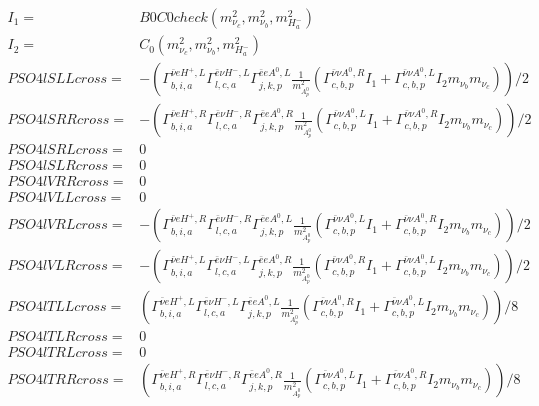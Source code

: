\documentclass[A4,landscape]{article}
\begin{document}
\begin{align} 
I_1= & B0C0check(m^2_{\nu_{{c}}}, m^2_{\nu_{{b}}}, m^2_{H^-_{{a}}}) \\ 
I_2= & C_0(m^2_{\nu_{{c}}}, m^2_{\nu_{{b}}}, m^2_{H^-_{{a}}}) \\ 
  PSO4lSLLcross= & -( \Gamma^{\bar{\nu}e H^+,L}_{b, i, a} \Gamma^{\bar{e}\nu H^- ,L}_{l, c, a} \Gamma^{\bar{e}e A^0 ,L}_{j, k, p} \frac{1}{m^2_{A^0_{{p}}}} (\Gamma^{\bar{\nu}\nu A^0 ,R}_{c, b, p} I_1 + \Gamma^{\bar{\nu}\nu A^0 ,L}_{c, b, p} I_2 m_{\nu_{{b}}} m_{\nu_{{c}}}))/2 \\ 
  PSO4lSRRcross= & -( \Gamma^{\bar{\nu}e H^+,R}_{b, i, a} \Gamma^{\bar{e}\nu H^- ,R}_{l, c, a} \Gamma^{\bar{e}e A^0 ,R}_{j, k, p} \frac{1}{m^2_{A^0_{{p}}}} (\Gamma^{\bar{\nu}\nu A^0 ,L}_{c, b, p} I_1 + \Gamma^{\bar{\nu}\nu A^0 ,R}_{c, b, p} I_2 m_{\nu_{{b}}} m_{\nu_{{c}}}))/2 \\ 
  PSO4lSRLcross= & 0 \\ 
  PSO4lSLRcross= & 0 \\ 
  PSO4lVRRcross= & 0 \\ 
  PSO4lVLLcross= & 0 \\ 
  PSO4lVRLcross= & -( \Gamma^{\bar{\nu}e H^+,R}_{b, i, a} \Gamma^{\bar{e}\nu H^- ,R}_{l, c, a} \Gamma^{\bar{e}e A^0 ,L}_{j, k, p} \frac{1}{m^2_{A^0_{{p}}}} (\Gamma^{\bar{\nu}\nu A^0 ,L}_{c, b, p} I_1 + \Gamma^{\bar{\nu}\nu A^0 ,R}_{c, b, p} I_2 m_{\nu_{{b}}} m_{\nu_{{c}}}))/2 \\ 
  PSO4lVLRcross= & -( \Gamma^{\bar{\nu}e H^+,L}_{b, i, a} \Gamma^{\bar{e}\nu H^- ,L}_{l, c, a} \Gamma^{\bar{e}e A^0 ,R}_{j, k, p} \frac{1}{m^2_{A^0_{{p}}}} (\Gamma^{\bar{\nu}\nu A^0 ,R}_{c, b, p} I_1 + \Gamma^{\bar{\nu}\nu A^0 ,L}_{c, b, p} I_2 m_{\nu_{{b}}} m_{\nu_{{c}}}))/2 \\ 
  PSO4lTLLcross= & ( \Gamma^{\bar{\nu}e H^+,L}_{b, i, a} \Gamma^{\bar{e}\nu H^- ,L}_{l, c, a} \Gamma^{\bar{e}e A^0 ,L}_{j, k, p} \frac{1}{m^2_{A^0_{{p}}}} (\Gamma^{\bar{\nu}\nu A^0 ,R}_{c, b, p} I_1 + \Gamma^{\bar{\nu}\nu A^0 ,L}_{c, b, p} I_2 m_{\nu_{{b}}} m_{\nu_{{c}}}))/8 \\ 
  PSO4lTLRcross= & 0 \\ 
  PSO4lTRLcross= & 0 \\ 
  PSO4lTRRcross= & ( \Gamma^{\bar{\nu}e H^+,R}_{b, i, a} \Gamma^{\bar{e}\nu H^- ,R}_{l, c, a} \Gamma^{\bar{e}e A^0 ,R}_{j, k, p} \frac{1}{m^2_{A^0_{{p}}}} (\Gamma^{\bar{\nu}\nu A^0 ,L}_{c, b, p} I_1 + \Gamma^{\bar{\nu}\nu A^0 ,R}_{c, b, p} I_2 m_{\nu_{{b}}} m_{\nu_{{c}}}))/8 \\ 
\end{align} 
\end{document}
